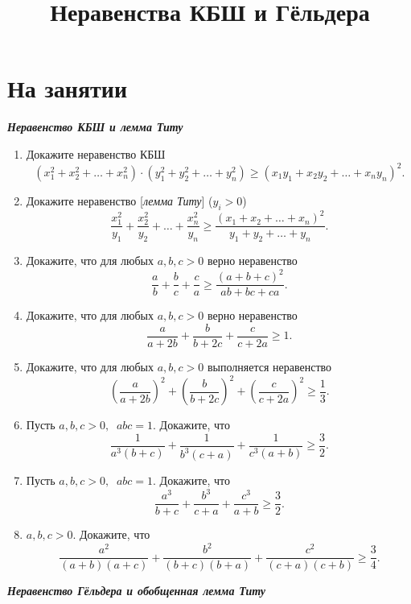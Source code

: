 \documentclass[a4paper,12pt,leqno]{article}
\title{\textbf{Неравенства КБШ и Гёльдера}}
\date{}
\begin{document}
	\parskip=0mm
	\linespread{1}
	\maketitle
	
	\newcommand{\z}{\addtocounter{zadacha}{1}%
		\boxed{\arabic{zadacha}} }
	\section*{На занятии}
	\textbf{\textit{Неравенство КБШ и лемма Титу}}
	\begin{enumerate}
		\item[\z] Докажите неравенство  КБШ
		$$(x_1^2 + x_2^2 + \dots + x_n^2)\cdot (y_1^2+y_2^2+ \dots + y_n^2) \geqslant (x_1y_1 + x_2y_2 + \dots + x_ny_n)^2 .$$
		
		\item[\z] Докажите неравенство [\textit{лемма Титу}] ($y_i > 0$)
		$$\frac{x_1^2}{y_1} + \frac{x_2^2}{y_2} + \dots + \frac{x_n^2}{y_n} \geqslant \frac{(x_1+x_2+ \dots + x_n)^2}{y_1+y_2+ \dots + y_n}.$$
		\item[\z] Докажите, что для любых $a, b, c > 0$ верно неравенство
		$$\frac{a}{b} + \frac{b}{c} + \frac{c}{a} \geqslant \frac{(a+b+c)^2}{ab + bc+ca}.$$
		\item[\z] Докажите, что для любых $a, b, c > 0$ верно неравенство
		$$\frac{a}{a+2b} + \frac{b}{b+2c}+ \frac{c}{c+2a} \geqslant 1.$$
		\item[\z] Докажите, что для любых $a, b, c > 0$ выполняется неравенство
		$$\left( \frac{a}{a+2b} \right) ^ 2 + \left( \frac{b}{b+2c}\right) ^2 + \left( \frac{c}{c+2a}\right)^2 \geqslant \frac{1}{3}  .$$
		\item[\z] Пусть $a, b, c > 0, \;\; abc = 1$. Докажите, что 
		$$\frac{1}{a^3(b+c)} + \frac{1}{b^3(c+a)} + \frac{1}{c^3(a+b)} \geqslant \frac{3}{2}.$$  
		\item[\z] Пусть $a, b, c > 0, \;\; abc=1$. Докажите, что 
		$$\frac{a^3}{b+c} + \frac{b^3}{c+a} + \frac{c^3}{a+b} \geqslant \frac{3}{2}.$$
		\item[\z] $a, b, c > 0$. Докажите, что 
		$$\frac{a^2}{(a+b)(a+c)} + \frac{b^2}{(b+c)(b+a)} + \frac{c^2}{(c+a)(c+b)} \geqslant \frac{3}{4}.$$
	\end{enumerate}
	
	\textbf{\textit{Неравенство Гёльдера и обобщенная лемма Титу}}
	
\end{document}

